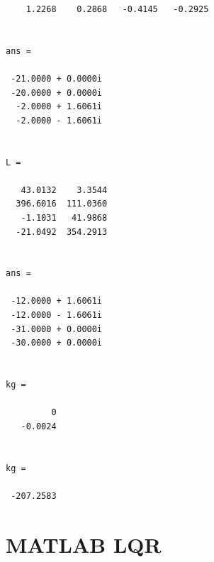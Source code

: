 \documentclass[12pt]{article}
\numberwithin{equation}{section}
\begin{document}
\begin{verbatim}
    1.2268    0.2868   -0.4145   -0.2925


ans =

 -21.0000 + 0.0000i
 -20.0000 + 0.0000i
  -2.0000 + 1.6061i
  -2.0000 - 1.6061i


L =

   43.0132    3.3544
  396.6016  111.0360
   -1.1031   41.9868
  -21.0492  354.2913


ans =

 -12.0000 + 1.6061i
 -12.0000 - 1.6061i
 -31.0000 + 0.0000i
 -30.0000 + 0.0000i


kg =

         0
   -0.0024


kg =

 -207.2583

\end{verbatim} \color{black}


\section{MATLAB LQR}
\label{app:lqr}
\end{document}

